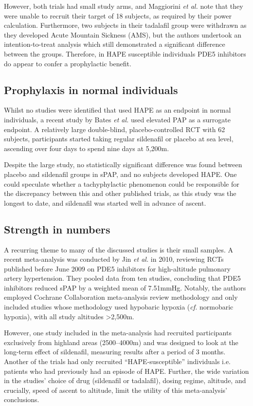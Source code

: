 \documentclass[12pt,a4paper]{article}
\begin{document}
However, both trials had small study arms, and Maggiorini \emph{et al.} note that they were unable to recruit their target of 18 subjects, as required by their power calculation. Furthermore, two subjects in their tadalafil group were withdrawn as they developed Acute Mountain Sickness (AMS), but the authors undertook an intention-to-treat analysis which still demonstrated a significant difference between the groups. Therefore, in HAPE susceptible individuals PDE5 inhibitors do appear to confer a prophylactic benefit.

\subsection*{Prophylaxis in normal individuals}

Whilst no studies were identified that used HAPE as an endpoint in normal individuals, a recent study by Bates \emph{et al.} used elevated PAP as a surrogate endpoint.\cite{Bates:2011du} A relatively large double-blind, placebo-controlled RCT with 62 subjects, participants started taking regular sildenafil or placebo at sea level, ascending over four days to spend nine days at 5,200m.

Despite the large study, no statistically significant difference was found between placebo and sildenafil groups in sPAP, and no subjects developed HAPE. One could speculate whether a tachyphylactic phenomenon could be responsible for the discrepancy between this and other published trials, as this study was the longest to date, and sildenafil was started well in advance of ascent.

\subsection*{Strength in numbers}

A recurring theme to many of the discussed studies is their small samples. A recent meta-analysis was conducted by Jin \emph{et al.} in 2010, reviewing RCTs published before June 2009 on PDE5 inhibitors for high-altitude pulmonary artery hypertension.\cite{Jin:2010fc} They pooled data from ten studies, concluding that PDE5 inhibitors reduced sPAP by a weighted mean of 7.51mmHg. Notably, the authors employed Cochrane Collaboration meta-analysis review methodology and only included studies whose methodology used hypobaric hypoxia (\emph{cf.} normobaric hypoxia), with all study altitudes >2,500m.

However, one study included in the meta-analysis had recruited participants exclusively from highland areas (2500--4000m) and was designed to look at the long-term effect of sildenafil, measuring results after a period of 3 months.\cite{Aldashev:2005fr} Another of the trials had only recruited ``HAPE-susceptible'' individuals i.e. patients who had previously had an episode of HAPE.\cite{Maggiorini:2006kz} Further, the wide variation in the studies' choice of drug (sildenafil or tadalafil), dosing regime, altitude, and crucially, speed of ascent to altitude, limit the utility of this meta-analysis' conclusions.
\end{document}
